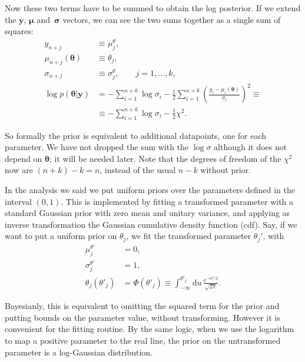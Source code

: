 Now these two terms have to be summed to obtain the log posterior. If we extend
the $\mathbf y$, $\boldsymbol\mu$ and~$\boldsymbol\sigma$ vectors, we can see
the two sums together as a single sum of squares:
%
\begin{align}
    y_{n+j} &\equiv \mu^\theta_j, \\
    \mu_{n+j}(\boldsymbol\theta) &\equiv \theta_j, \\
    \sigma_{n+j} &\equiv \sigma^\theta_j, \qquad j = 1, \ldots, k, \\
    \log p(\boldsymbol\theta|\mathbf y) &=
    -\sum_{i=1}^{n+k} \log\sigma_i
    - \frac 12 \sum_{i=1}^{n+k}
    \left( \frac {y_i - \mu_i(\boldsymbol\theta)} {\sigma_i} \right)^2 \equiv \\
    &\equiv -\sum_{i=1}^{n+k} \log\sigma_i - \frac12 \chi^2. \label{eq:chi2}
\end{align}

So formally the prior is equivalent to additional datapoints, one for each
parameter. We have not dropped the sum with the $\log\sigma$ although it does
not depend on $\boldsymbol\theta$; it will be needed later. Note that the
degrees of freedom of the $\chi^2$ now are $(n+k)-k = n$, instead of the usual
$n-k$ without prior.

In the analysis we said we put uniform priors over the parameters defined in
the interval $(0,1)$. This is implemented by fitting a transformed parameter
with a standard Gaussian prior with zero mean and unitary variance, and
applying as inverse transformation the Gaussian cumulative density function
(cdf). Say, if we want to put a uniform prior on $\theta_j$, we fit the
transformed parameter $\theta_j'$, with
%
\begin{align}
    \mu^{\theta'}_j &= 0, \\
    \sigma^{\theta'}_j &= 1, \\
    \theta_j(\theta'_j) &= \Phi(\theta'_j)
    \equiv \int_{-\infty}^{\theta'_j} \mathrm du\,
    \frac {e^{-u^2/2}} {\sqrt{2\pi}}.
\end{align}

Bayesianly, this is equivalent to omitting the squared term for the prior and
putting bounds on the parameter value, without transforming. However it is
convenient for the fitting routine. By the same logic, when we use the
logarithm to map a positive parameter to the real line, the prior on the
untransformed parameter is a log-Gaussian distribution.

